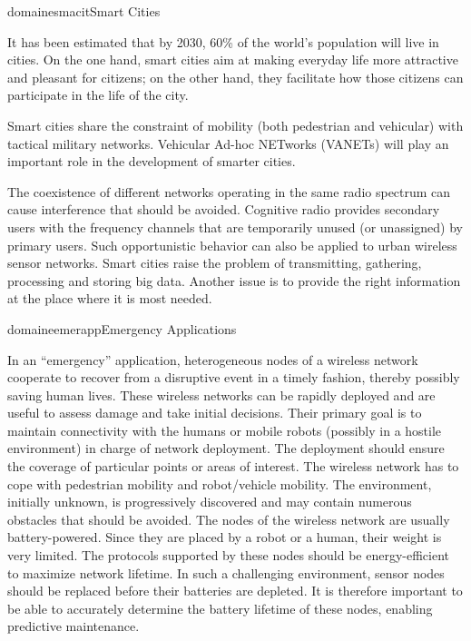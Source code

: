 \documentclass{ra2016}
\begin{document}
\begin{module}{domaine}{smacit}{Smart Cities}

It has been estimated that by 2030, 60\% of the world's population will live in cities. On the one hand, smart cities aim at making everyday life more attractive and pleasant for citizens; on the other hand, they facilitate how those citizens can participate in the life of the city.

Smart cities share the constraint of mobility (both pedestrian and vehicular) with tactical military networks. Vehicular Ad-hoc NETworks (VANETs) will play an important role in the development of smarter cities.

The coexistence of different networks operating in the same radio spectrum can cause interference that should be avoided. Cognitive radio provides secondary users with the frequency channels that are temporarily unused (or unassigned) by primary users. Such opportunistic behavior can also be applied to urban wireless sensor networks. Smart cities raise the problem of transmitting, gathering, processing and storing big data. Another issue is to provide the right information at the place where it is most needed.

\end{module}

\begin{module}{domaine}{emerapp}{Emergency Applications}

In an ``emergency'' application, heterogeneous nodes of a wireless network cooperate to recover from a disruptive event in a timely fashion, thereby possibly saving human lives. These wireless networks can be rapidly deployed and are useful to assess damage and take initial decisions. Their primary goal is to maintain connectivity with the humans or mobile robots (possibly in a hostile environment) in charge of network deployment. The deployment should ensure the coverage of particular points or areas of interest. The wireless network has to cope with pedestrian mobility and robot/vehicle mobility. The environment, initially unknown, is progressively discovered and may contain numerous obstacles that should be avoided. The nodes of the wireless network are usually battery-powered. Since they are placed by a robot or a human, their weight is very limited. The protocols supported by these nodes should be energy-efficient to maximize network lifetime. In such a challenging environment, sensor nodes should be replaced before their batteries are depleted. It is therefore important to be able to accurately determine the battery lifetime of these nodes, enabling predictive maintenance.

\end{module}
\end{document}
